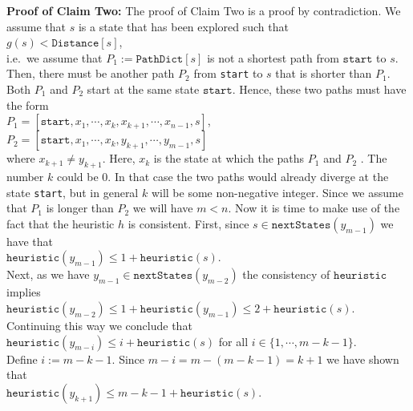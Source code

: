 \noindent
\textbf{Proof of Claim Two:}  The proof of Claim Two is a proof by contradiction.  We assume that $s$ is a
state that has been explored such that 
\\[0.2cm]
\hspace*{1.3cm}
$g(s) < \mathtt{Distance}[s]$,
\\[0.2cm]
i.e.~we assume that $P_1 := \texttt{PathDict}[s]$ is not a shortest path from $\texttt{start}$ to $s$.  Then,
there must be another path $P_2$ from \texttt{start} to $s$ that is shorter than $P_1$.  Both $P_1$ and $P_2$
start at the same state $\texttt{start}$.  Hence, these two paths must have the form
\\[0.2cm]
\hspace*{1.3cm}
$P_1 = [\texttt{start},x_1,\cdots,x_k, x_{k+1},\cdots,x_{n-1},s]$,  \quad 
$P_2 = [\texttt{start},x_1,\cdots,x_k, y_{k+1},\cdots,y_{m-1},s]$ \quad 
\\[0.2cm]
where $x_{k+1} \not= y_{k+1}$.  Here, $x_k$ is the state at which the paths $P_1$ and $P_2$ . The
number $k$ could be $0$.  In that case the two paths would already diverge at the state \texttt{start}, but in
general $k$ will be some non-negative integer.  Since we assume that $P_1$ is longer than $P_2$ we will have
$m < n$.  Now it is time to make use of the fact that the heuristic $h$ is consistent.  First, since
$s \in \texttt{nextStates}(y_{m-1})$  we have that 
\\[0.2cm]
\hspace*{1.3cm}
$\texttt{heuristic}(y_{m-1}) \leq 1 + \texttt{heuristic}(s)$.
\\[0.2cm]
Next, as we have $y_{m-1} \in \texttt{nextStates}(y_{m-2})$ the consistency of $\texttt{heuristic}$ implies
\\[0.2cm]
\hspace*{1.3cm}
$\texttt{heuristic}(y_{m-2}) \leq 1 + \texttt{heuristic}(y_{m-1}) \leq 2 + \texttt{heuristic}(s)$.
\\[0.2cm]
Continuing this way we conclude that
\\[0.2cm]
\hspace*{1.3cm}
$\texttt{heuristic}(y_{m-i}) \leq i + \texttt{heuristic}(s)$  \quad for all $i\in\{1,\cdots,m-k-1\}$.
\\[0.2cm]
Define $i:= m - k - 1$.  Since $m-i = m - (m - k - 1) = k+1$ we have shown that
\\[0.2cm]
\hspace*{1.3cm}
$\texttt{heuristic}(y_{k+1}) \leq m - k - 1 + \texttt{heuristic}(s)$.
\\[0.2cm]
